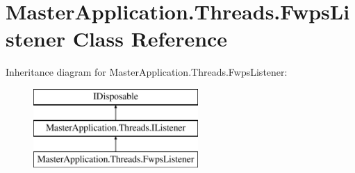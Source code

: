 \hypertarget{class_master_application_1_1_threads_1_1_fwps_listener}{}\section{Master\+Application.\+Threads.\+Fwps\+Listener Class Reference}
\label{class_master_application_1_1_threads_1_1_fwps_listener}
Inheritance diagram for Master\+Application.\+Threads.\+Fwps\+Listener\+:\begin{figure}[H]
\begin{center}
\leavevmode
\includegraphics[height=3.000000cm]{class_master_application_1_1_threads_1_1_fwps_listener}
\end{center}
\end{figure}
